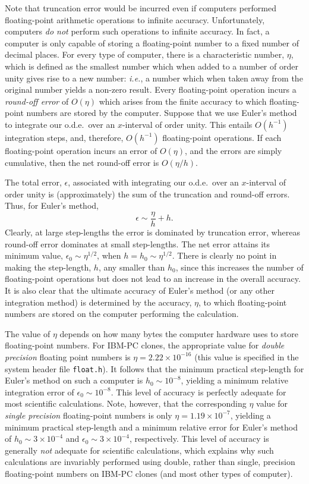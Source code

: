 Note that truncation error would be incurred even if computers performed
floating-point arithmetic operations to infinite accuracy. Unfortunately, computers
{\em do not}\/ perform such  operations to infinite accuracy. In fact,
a computer is only capable
of storing a floating-point number to a fixed number of
decimal places. For every type of computer, there is a characteristic  number,
$\eta$, which is defined as the smallest number which when added to a number
of order unity gives rise to a new number: {\em i.e.}, a number
which when taken away from the original number yields a non-zero result.
Every floating-point operation incurs a {\em round-off error}\/ of $O(\eta)$
which arises from the finite accuracy to which floating-point numbers
are stored by the computer. Suppose that we use Euler's method
to integrate our o.d.e.\ over an $x$-interval of order unity. This
entails $O(h^{-1})$ integration steps, and, therefore, $O(h^{-1})$
floating-point operations. If each floating-point operation incurs
an error of $O(\eta)$, and the errors are simply cumulative, then
the net round-off error is $O(\eta/h)$. 

The total error, $\epsilon$, associated with
integrating our o.d.e.\ over an $x$-interval of order unity is (approximately) 
the 	sum of the truncation and round-off errors. Thus,
for Euler's method,
\begin{equation}
\epsilon \sim \frac{\eta}{h} + h.
\end{equation}
Clearly, at large step-lengths the error is dominated by truncation error, whereas
round-off error dominates at small step-lengths. The net error attains
its minimum value, $\epsilon_0\sim \eta^{1/2}$, when $h=h_0\sim \eta^{1/2}$.
There is clearly no point in making the step-length, $h$, any smaller than $h_0$,
since this increases the number of floating-point operations but does
not lead to an increase in the overall accuracy. It is also clear that the
ultimate accuracy of Euler's method (or any other integration method) is
determined by the accuracy, $\eta$, to which floating-point numbers are
stored on the computer performing the calculation.

The value of $\eta$ depends on how many bytes the computer
hardware uses to store floating-point numbers. For
IBM-PC clones, the appropriate value for {\em double precision}\/ floating
point numbers is $\eta = 2.22\times 10^{-16}$ (this value is specified
in the system header file {\tt float.h}). It follows that the minimum practical
step-length for Euler's method on such a computer is $h_0\sim 10^{-8}$, yielding
a minimum relative integration error of $\epsilon_0\sim 10^{-8}$. 	This
level of accuracy is perfectly adequate for most scientific calculations. 
Note, however, that the corresponding $\eta$ value for {\em single precision}\/
floating-point numbers is only $\eta=1.19\times 10^{-7}$, yielding a minimum
practical step-length and a minimum relative error for Euler's method of $h_0\sim 3\times
10^{-4}$ and $\epsilon_0\sim 3\times 10^{-4}$, respectively. This level
of accuracy is generally {\em not}\/ adequate for scientific calculations, which
explains why such calculations are invariably performed using
double, rather than single, precision floating-point numbers on IBM-PC clones
(and most other types of computer).

